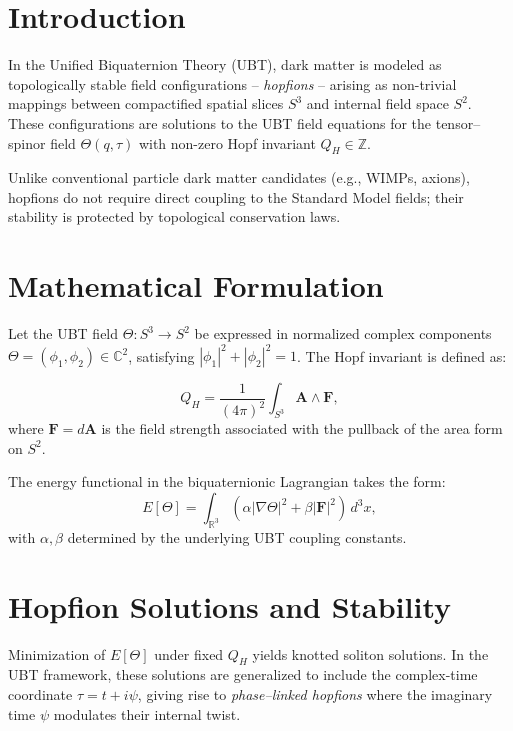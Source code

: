 

\section*{Introduction}
In the Unified Biquaternion Theory (UBT), dark matter is modeled as topologically stable field configurations – \emph{hopfions} – arising as non-trivial mappings between compactified spatial slices \(S^3\) and internal field space \(S^2\). These configurations are solutions to the UBT field equations for the tensor–spinor field \(\Theta(q,\tau)\) with non-zero Hopf invariant \(Q_H \in \mathbb{Z}\).

Unlike conventional particle dark matter candidates (e.g., WIMPs, axions), hopfions do not require direct coupling to the Standard Model fields; their stability is protected by topological conservation laws.

\section*{Mathematical Formulation}
Let the UBT field \(\Theta: S^3 \to S^2\) be expressed in normalized complex components \(\Theta = (\phi_1, \phi_2) \in \mathbb{C}^2\), satisfying \(|\phi_1|^2 + |\phi_2|^2 = 1\). The Hopf invariant is defined as:

\begin{equation}
Q_H = \frac{1}{(4\pi)^2} \int_{S^3} \mathbf{A} \wedge \mathbf{F},
\end{equation}
where \(\mathbf{F} = d\mathbf{A}\) is the field strength associated with the pullback of the area form on \(S^2\).

The energy functional in the biquaternionic Lagrangian takes the form:
\begin{equation}
E[\Theta] = \int_{\mathbb{R}^3} \left( \alpha |\nabla \Theta|^2 + \beta |\mathbf{F}|^2 \right) \, d^3x,
\end{equation}
with \(\alpha, \beta\) determined by the underlying UBT coupling constants.

\section*{Hopfion Solutions and Stability}
Minimization of \(E[\Theta]\) under fixed \(Q_H\) yields knotted soliton solutions. In the UBT framework, these solutions are generalized to include the complex-time coordinate \(\tau = t + i\psi\), giving rise to \emph{phase–linked hopfions} where the imaginary time \(\psi\) modulates their internal twist.


